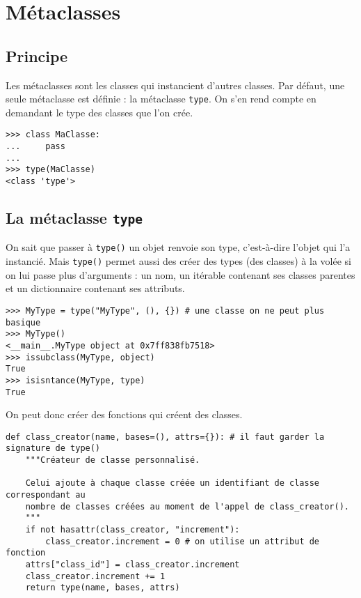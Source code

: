 \section{Métaclasses}
\subsection{Principe}
\label{sec:metaclasses}
Les métaclasses sont les classes qui instancient d'autres classes. Par défaut, une seule métaclasse est définie : la métaclasse \texttt{type}. On s'en rend compte en demandant le type des classes que l'on crée.

\begin{verbatim}
>>> class MaClasse:
...     pass
...
>>> type(MaClasse)
<class 'type'>
\end{verbatim}

\subsection[La métaclasse type]{La métaclasse \texttt{type}}

On sait que passer à \texttt{type()} un objet renvoie son type, c'est-à-dire l'objet qui l'a instancié. Mais
\texttt{type()} permet aussi des créer des types (des classes) à la volée si on lui passe plus d'arguments :
un nom, un itérable contenant ses classes parentes et un dictionnaire contenant ses attributs.

\begin{verbatim}
>>> MyType = type("MyType", (), {}) # une classe on ne peut plus basique
>>> MyType()
<__main__.MyType object at 0x7ff838fb7518>
>>> issubclass(MyType, object)
True
>>> isisntance(MyType, type)
True
\end{verbatim}

On peut donc créer des fonctions qui créent des classes.

\begin{verbatim}
def class_creator(name, bases=(), attrs={}): # il faut garder la signature de type()
    """Créateur de classe personnalisé.

    Celui ajoute à chaque classe créée un identifiant de classe correspondant au
    nombre de classes créées au moment de l'appel de class_creator().
    """
    if not hasattr(class_creator, "increment"):
        class_creator.increment = 0 # on utilise un attribut de fonction
    attrs["class_id"] = class_creator.increment
    class_creator.increment += 1
    return type(name, bases, attrs)
\end{verbatim}

